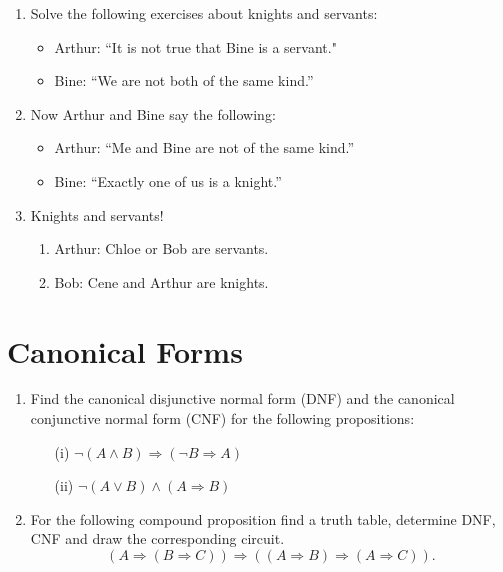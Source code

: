 \documentclass[11pt,paper=b5,footinclude,headinclude]{scrbook} %
\theoremstyle{remark}
\theoremstyle{definition} %
\theoremstyle{theorem} %
\begin{document}
\begin{enumerate}[resume, label=\textbf{Problem \arabic*.}]





\item Solve the following exercises about knights and servants:
\begin{itemize}
  \item Arthur: ``It is not true that Bine is a servant."
  \item Bine: ``We are not both of the same kind.''
\end{itemize}




\item 
Now Arthur and Bine say the following:
\begin{itemize}
 \item Arthur: ``Me and Bine are not of the same kind.''
 \item Bine: ``Exactly one of us is a knight.''
\end{itemize}


\item Knights and servants! 
\begin{enumerate}

\item Arthur: Chloe or Bob are servants.
\item 
Bob: Cene and Arthur are knights.
\end{enumerate}


\end{enumerate}



\section{Canonical Forms}
\begin{enumerate}[resume, label=\textbf{Problem \arabic*.}]
    \item Find the canonical disjunctive normal form (DNF) and the canonical conjunctive normal form (CNF) for the following propositions:
    \begin{itemize}
        \item[(i)] $\neg(A \land B) \Rightarrow (\neg B \Rightarrow A)$
        \item[(ii)] $\neg(A \lor B) \land (A \Rightarrow B)$
    \end{itemize}




\item For the following compound proposition find  a truth table, determine DNF, CNF and draw the corresponding circuit.
$$
(A \Rightarrow (B\Rightarrow C)) \Rightarrow ((A\Rightarrow B)\Rightarrow (A \Rightarrow C)).
$$

\end{enumerate}
\end{document}
